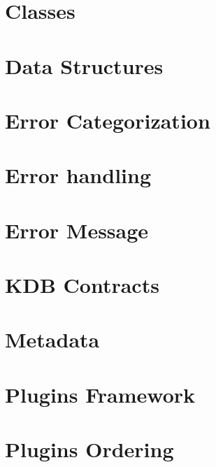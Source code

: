 \let\mypdfximage\pdfximage\def\pdfximage{\immediate\mypdfximage}\documentclass[twoside]{book}
\newcommand{\+}{\discretionary{\mbox{\scriptsize$\hookleftarrow$}}{}{}}
\begin{document}
\chapter{Classes}
\label{doc_dev_classes_md}

\chapter{Data Structures}
\label{doc_dev_data-structures_md}

\chapter{Error Categorization}
\label{doc_dev_error-categorization_md}

\chapter{Error handling}
\label{doc_dev_error-handling_md}

\chapter{Error Message}
\label{doc_dev_error-message_md}

\chapter{KDB Contracts}
\label{doc_dev_kdb-contracts_md}

\chapter{Metadata}
\label{doc_dev_metadata_md}

\chapter{Plugins Framework}
\label{doc_dev_plugins-framework_md}

\chapter{Plugins Ordering}
\label{doc_dev_plugins-ordering_md}

\end{document}
